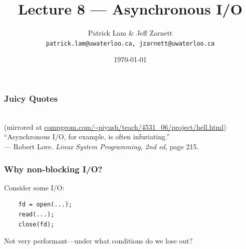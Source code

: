

\title{Lecture 8 --- Asynchronous I/O}

\author{Patrick Lam \& Jeff Zarnett \\ \small \texttt{patrick.lam@uwaterloo.ca, jzarnett@uwaterloo.ca}}
\date{\today}




\begin{frame}
  \titlepage

 \end{frame}

\begin{frame}
  \frametitle{Juicy Quotes}


  \\
{\scriptsize (mirrored at \url{compgeom.com/~piyush/teach/4531_06/project/hell.html})}
   \\[3em]

   ``Asynchronous I/O, for example, is often infuriating.''\\
--- Robert Love. {\em Linux System Programming, 2nd ed, } page 215.
  

\end{frame}

\begin{frame}[fragile]
  \frametitle{Why non-blocking I/O?}
  
  Consider some I/O:


\begin{minipage}{.5\textwidth}
\begin{lstlisting}
    fd = open(...);
    read(...);
    close(fd);
  \end{lstlisting}
\end{minipage}


  Not very performant---under what conditions do we lose out?

\end{frame}

